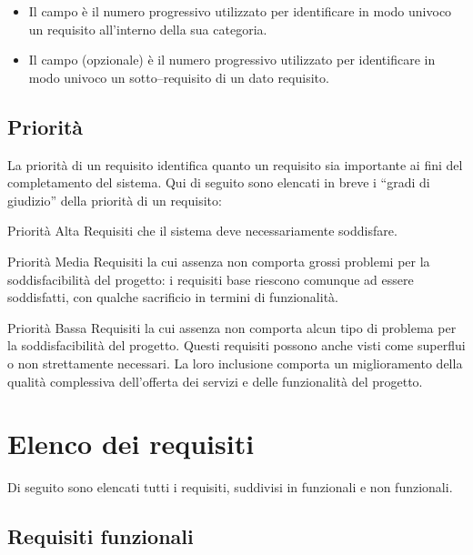 \begin{itemize}
	\item Il campo  è il numero progressivo utilizzato per identificare in modo univoco un requisito all'interno della sua categoria.

	\item Il campo  (opzionale) è il numero progressivo utilizzato per identificare in modo univoco un sotto--requisito di un dato requisito.
\end{itemize}

\subsection{Priorità}
\label{subsec:priorita}

La priorità di un requisito identifica quanto un requisito sia importante ai fini del completamento del sistema.
Qui di seguito sono elencati in breve i ``gradi di giudizio'' della priorità di un requisito:

\begin{descriptionInd}
	\item[Priorità Alta] Requisiti che il sistema deve necessariamente soddisfare.
	\item[Priorità Media] Requisiti la cui assenza non comporta grossi problemi per la soddisfacibilità del progetto: i requisiti base riescono comunque ad essere soddisfatti, con qualche sacrificio in termini di funzionalità. 
	\item[Priorità Bassa] Requisiti la cui assenza non comporta alcun tipo di problema per la soddisfacibilità del progetto. Questi requisiti possono anche visti come superflui o non strettamente necessari. La loro inclusione comporta un miglioramento della qualità complessiva dell’offerta dei servizi e delle funzionalità del progetto.
\end{descriptionInd}

\section{Elenco dei requisiti}
\label{sec:elenco_dei_requisiti}
Di seguito sono elencati tutti i requisiti, suddivisi in funzionali e non funzionali.

\subsection{Requisiti funzionali}


